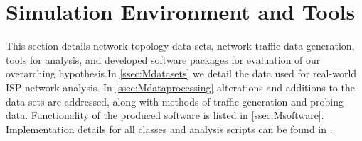 \section{Simulation Environment and Tools}
\label{sec:Msimenvironment}
This section details network topology data sets, network traffic data generation, tools for analysis, and developed software packages for evaluation of our overarching hypothesis.In \cref{ssec:Mdatasets} we detail the data used for real-world ISP network analysis. In \cref{ssec:Mdataprocessing} alterations and additions to the data sets are addressed, along with methods of traffic generation and probing data. Functionality of the produced software is listed in \cref{ssec:Msoftware}. Implementation details for all classes and analysis scripts can be found in \cite{sylvester_millar_real_2021}.

